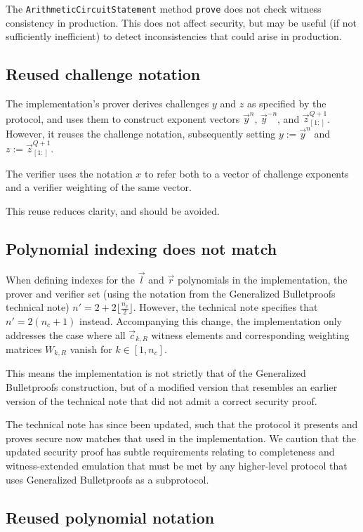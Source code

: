 \documentclass{article}
\begin{document}
The \texttt{ArithmeticCircuitStatement} method \texttt{prove} does not check witness consistency in production.
This does not affect security, but may be useful (if not sufficiently inefficient) to detect inconsistencies that could arise in production.


\subsection{Reused challenge notation}

The implementation's prover derives challenges $y$ and $z$ as specified by the protocol, and uses them to construct exponent vectors $\vec{y}^n$, $\vec{y}^{-n}$, and $\vec{z}_{[1:]}^{Q+1}$.
However, it reuses the challenge notation, subsequently setting $y := \vec{y}^n$ and $z := \vec{z}_{[1:]}^{Q+1}$.

The verifier uses the notation $x$ to refer both to a vector of challenge exponents and a verifier weighting of the same vector.

This reuse reduces clarity, and should be avoided.


\subsection{Polynomial indexing does not match}

When defining indexes for the $\vec{l}$ and $\vec{r}$ polynomials in the implementation, the prover and verifier set (using the notation from the Generalized Bulletproofs technical note) $n' = 2 + 2 \lfloor \frac{n_c}{2} \rfloor$.
However, the technical note specifies that $n' = 2( n_c + 1 )$ instead.
Accompanying this change, the implementation only addresses the case where all $\vec{c}_{k,R}$ witness elements and corresponding weighting matrices $W_{k,R}$ vanish for $k \in [1, n_c]$.

This means the implementation is not strictly that of the Generalized Bulletproofs construction, but of a modified version that resembles an earlier version of the technical note that did not admit a correct security proof.

The technical note has since been updated, such that the protocol it presents and proves secure now matches that used in the implementation.
We caution that the updated security proof has subtle requirements relating to completeness and witness-extended emulation that must be met by any higher-level protocol that uses Generalized Bulletproofs as a subprotocol.


\subsection{Reused polynomial notation}
\end{document}
